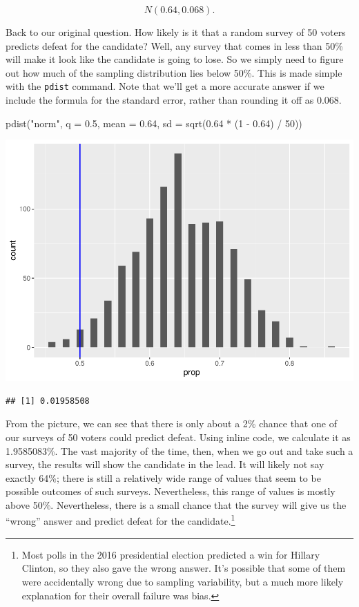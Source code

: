 \documentclass[
]{book}
\newenvironment{Shaded}{\begin{snugshade}}{\end{snugshade}}
\newcommand{\AttributeTok}[1]{\textcolor[rgb]{0.77,0.63,0.00}{#1}}
\newcommand{\DecValTok}[1]{\textcolor[rgb]{0.00,0.00,0.81}{#1}}
\newcommand{\FloatTok}[1]{\textcolor[rgb]{0.00,0.00,0.81}{#1}}
\newcommand{\FunctionTok}[1]{\textcolor[rgb]{0.00,0.00,0.00}{#1}}
\newcommand{\NormalTok}[1]{#1}
\newcommand{\SpecialCharTok}[1]{\textcolor[rgb]{0.00,0.00,0.00}{#1}}
\newcommand{\StringTok}[1]{\textcolor[rgb]{0.31,0.60,0.02}{#1}}
\begin{document}
\[
N(0.64, 0.068).
\]

Back to our original question. How likely is it that a random survey of 50 voters predicts defeat for the candidate? Well, any survey that comes in less than 50\% will make it look like the candidate is going to lose. So we simply need to figure out how much of the sampling distribution lies below 50\%. This is made simple with the \texttt{pdist} command. Note that we'll get a more accurate answer if we include the formula for the standard error, rather than rounding it off as 0.068.

\begin{Shaded}
\begin{Highlighting}[]
\FunctionTok{pdist}\NormalTok{(}\StringTok{"norm"}\NormalTok{, }\AttributeTok{q =} \FloatTok{0.5}\NormalTok{,}
      \AttributeTok{mean =} \FloatTok{0.64}\NormalTok{, }\AttributeTok{sd =} \FunctionTok{sqrt}\NormalTok{(}\FloatTok{0.64} \SpecialCharTok{*}\NormalTok{ (}\DecValTok{1} \SpecialCharTok{{-}} \FloatTok{0.64}\NormalTok{) }\SpecialCharTok{/} \DecValTok{50}\NormalTok{))}
\end{Highlighting}
\end{Shaded}

\includegraphics{intro_stats_files/figure-latex/unnamed-chunk-376-1.pdf}

\begin{verbatim}
## [1] 0.01958508
\end{verbatim}

From the picture, we can see that there is only about a 2\% chance that one of our surveys of 50 voters could predict defeat. Using inline code, we calculate it as 1.9585083\%. The vast majority of the time, then, when we go out and take such a survey, the results will show the candidate in the lead. It will likely not say exactly 64\%; there is still a relatively wide range of values that seem to be possible outcomes of such surveys. Nevertheless, this range of values is mostly above 50\%. Nevertheless, there is a small chance that the survey will give us the ``wrong'' answer and predict defeat for the candidate.\footnote{Most polls in the 2016 presidential election predicted a win for Hillary Clinton, so they also gave the wrong answer. It's possible that some of them were accidentally wrong due to sampling variability, but a much more likely explanation for their overall failure was bias.}
\end{document}
